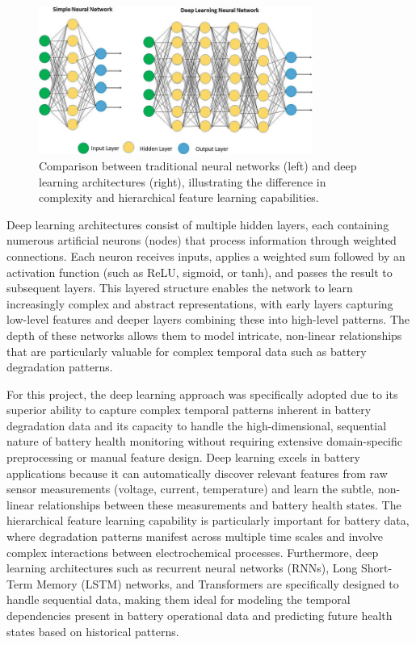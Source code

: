 \begin{figure}[htbp]
\centering
\includegraphics[width=0.8\textwidth]{imgs/neural_vs_deep.png}
\caption{Comparison between traditional neural networks (left) and deep learning architectures (right), illustrating the difference in complexity and hierarchical feature learning capabilities.}
\label{fig:neural_vs_deep}
\end{figure}

Deep learning architectures consist of multiple hidden layers, each containing numerous artificial neurons (nodes) that process information through weighted connections. Each neuron receives inputs, applies a weighted sum followed by an activation function (such as ReLU, sigmoid, or tanh), and passes the result to subsequent layers. This layered structure enables the network to learn increasingly complex and abstract representations, with early layers capturing low-level features and deeper layers combining these into high-level patterns. The depth of these networks allows them to model intricate, non-linear relationships that are particularly valuable for complex temporal data such as battery degradation patterns.

For this project, the deep learning approach was specifically adopted due to its superior ability to capture complex temporal patterns inherent in battery degradation data and its capacity to handle the high-dimensional, sequential nature of battery health monitoring without requiring extensive domain-specific preprocessing or manual feature design. Deep learning excels in battery applications because it can automatically discover relevant features from raw sensor measurements (voltage, current, temperature) and learn the subtle, non-linear relationships between these measurements and battery health states. The hierarchical feature learning capability is particularly important for battery data, where degradation patterns manifest across multiple time scales and involve complex interactions between electrochemical processes. Furthermore, deep learning architectures such as recurrent neural networks (RNNs), Long Short-Term Memory (LSTM) networks, and Transformers are specifically designed to handle sequential data, making them ideal for modeling the temporal dependencies present in battery operational data and predicting future health states based on historical patterns.


